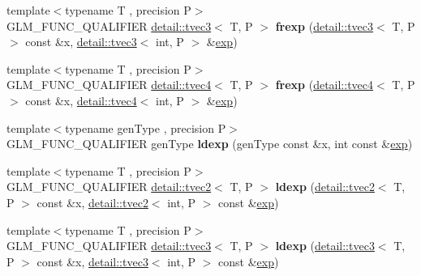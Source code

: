 \begin{DoxyCompactItemize}
\item 
{\footnotesize template$<$typename T , precision P$>$ }\\G\+L\+M\+\_\+\+F\+U\+N\+C\+\_\+\+Q\+U\+A\+L\+I\+F\+I\+ER \hyperlink{structglm_1_1detail_1_1tvec3}{detail\+::tvec3}$<$ T, P $>$ {\bfseries frexp} (\hyperlink{structglm_1_1detail_1_1tvec3}{detail\+::tvec3}$<$ T, P $>$ const \&x, \hyperlink{structglm_1_1detail_1_1tvec3}{detail\+::tvec3}$<$ int, P $>$ \&\hyperlink{group__core__func__exponential_gae154699ba6bda068d4b87cf9b987381f}{exp})\hypertarget{namespaceglm_afb702f1a288d4a5010b732b5bbbfaad6}{}\label{namespaceglm_afb702f1a288d4a5010b732b5bbbfaad6}

\item 
{\footnotesize template$<$typename T , precision P$>$ }\\G\+L\+M\+\_\+\+F\+U\+N\+C\+\_\+\+Q\+U\+A\+L\+I\+F\+I\+ER \hyperlink{structglm_1_1detail_1_1tvec4}{detail\+::tvec4}$<$ T, P $>$ {\bfseries frexp} (\hyperlink{structglm_1_1detail_1_1tvec4}{detail\+::tvec4}$<$ T, P $>$ const \&x, \hyperlink{structglm_1_1detail_1_1tvec4}{detail\+::tvec4}$<$ int, P $>$ \&\hyperlink{group__core__func__exponential_gae154699ba6bda068d4b87cf9b987381f}{exp})\hypertarget{namespaceglm_ad81e7dc1f395a13d442c19fa6b90b9d2}{}\label{namespaceglm_ad81e7dc1f395a13d442c19fa6b90b9d2}

\item 
{\footnotesize template$<$typename gen\+Type , precision P$>$ }\\G\+L\+M\+\_\+\+F\+U\+N\+C\+\_\+\+Q\+U\+A\+L\+I\+F\+I\+ER gen\+Type {\bfseries ldexp} (gen\+Type const \&x, int const \&\hyperlink{group__core__func__exponential_gae154699ba6bda068d4b87cf9b987381f}{exp})\hypertarget{namespaceglm_a5c453639629fa99ccaa3438e455866b3}{}\label{namespaceglm_a5c453639629fa99ccaa3438e455866b3}

\item 
{\footnotesize template$<$typename T , precision P$>$ }\\G\+L\+M\+\_\+\+F\+U\+N\+C\+\_\+\+Q\+U\+A\+L\+I\+F\+I\+ER \hyperlink{structglm_1_1detail_1_1tvec2}{detail\+::tvec2}$<$ T, P $>$ {\bfseries ldexp} (\hyperlink{structglm_1_1detail_1_1tvec2}{detail\+::tvec2}$<$ T, P $>$ const \&x, \hyperlink{structglm_1_1detail_1_1tvec2}{detail\+::tvec2}$<$ int, P $>$ const \&\hyperlink{group__core__func__exponential_gae154699ba6bda068d4b87cf9b987381f}{exp})\hypertarget{namespaceglm_af792ae464dc2c26112c9387f633d1c51}{}\label{namespaceglm_af792ae464dc2c26112c9387f633d1c51}

\item 
{\footnotesize template$<$typename T , precision P$>$ }\\G\+L\+M\+\_\+\+F\+U\+N\+C\+\_\+\+Q\+U\+A\+L\+I\+F\+I\+ER \hyperlink{structglm_1_1detail_1_1tvec3}{detail\+::tvec3}$<$ T, P $>$ {\bfseries ldexp} (\hyperlink{structglm_1_1detail_1_1tvec3}{detail\+::tvec3}$<$ T, P $>$ const \&x, \hyperlink{structglm_1_1detail_1_1tvec3}{detail\+::tvec3}$<$ int, P $>$ const \&\hyperlink{group__core__func__exponential_gae154699ba6bda068d4b87cf9b987381f}{exp})\hypertarget{namespaceglm_a81c3a6c6aed7a170864f9873dc422bc2}{}\label{namespaceglm_a81c3a6c6aed7a170864f9873dc422bc2}


\end{DoxyCompactItemize}
